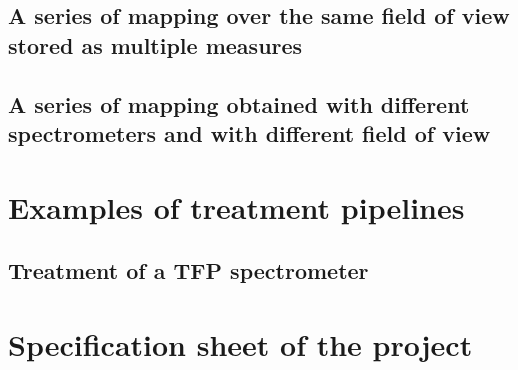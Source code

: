 \documentclass{book}
\begin{document}
    \section{A series of mapping over the same field of view stored as multiple measures}
        
    
    \section{A series of mapping obtained with different spectrometers and with different field of view}
        

\chapter{Examples of treatment pipelines}
    \section{Treatment of a TFP spectrometer} \label{subsec:example_treatment.TFP}
        
        

\chapter{Specification sheet of the project}
    
\end{document}
